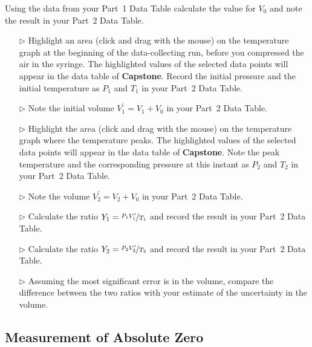 Using the data from your Part~1 Data Table calculate the value for $V_{0}$ and note the result in your Part~2 Data Table.
\begin{itemize}
\item[$\triangleright$] Highlight an area (click and drag with the mouse) on the temperature graph at the beginning of the data-collecting run, before you compressed the air in the syringe. The highlighted values of the selected data points will appear in the data table of \textbf{Capstone}. Record the initial pressure and the initial temperature as $P_{1}$ and $T_{1}$ in your Part~2 Data Table.
\item[$\triangleright$] Note the initial volume $V_{1}^\prime = V_{1} + V_{0}$ in  your Part~2 Data Table.
\item[$\triangleright$] Highlight the area (click and drag with the mouse) on the temperature graph where the temperature peaks. The highlighted values of the selected data points will appear in the data table of \textbf{Capstone}. Note the peak temperature and the corresponding pressure at this instant as $P_{2}$ and $T_{2}$ in  your Part~2 Data Table.
\item[$\triangleright$] Note the volume $V_{2}^\prime = V_{2} + V_{0}$ in your Part~2 Data Table.
\item[$\triangleright$] Calculate the ratio $Y_{1} = \nicefrac{P_{1} V_{1}^\prime}{T_{1}}$ and record the result in your Part~2 Data Table.
\item[$\triangleright$] Calculate the ratio $Y_{2} = \nicefrac{P_{2} V_{2}^\prime}{T_{2}}$ and record the result in your Part~2 Data Table.
\item[$\triangleright$] Assuming the most significant error is in the volume, compare the difference between the two ratios with your estimate of the uncertainty in the volume.
\end{itemize}

\subsection{Measurement of Absolute Zero}

